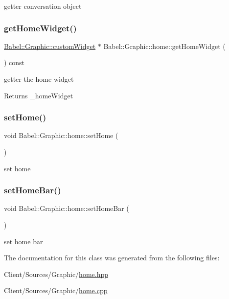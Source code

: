 getter conversation object \mbox{\label{classBabel_1_1Graphic_1_1home_a2c22835d143b5137919c9dd9fb32e653}} 
\subsubsection{\texorpdfstring{get\+Home\+Widget()}{getHomeWidget()}}
{\footnotesize\ttfamily \hyperlink{classBabel_1_1Graphic_1_1customWidget}{Babel\+::\+Graphic\+::custom\+Widget} $\ast$ Babel\+::\+Graphic\+::home\+::get\+Home\+Widget (\begin{DoxyParamCaption}{ }\end{DoxyParamCaption}) const}

getter the home widget \begin{DoxyReturn}{Returns}
\+\_\+home\+Widget 
\end{DoxyReturn}
\mbox{\label{classBabel_1_1Graphic_1_1home_ac64978cf021005f93a8050929d2151b5}} 
\subsubsection{\texorpdfstring{set\+Home()}{setHome()}}
{\footnotesize\ttfamily void Babel\+::\+Graphic\+::home\+::set\+Home (\begin{DoxyParamCaption}{ }\end{DoxyParamCaption})}

set home \mbox{\label{classBabel_1_1Graphic_1_1home_ac6ea1576dd3ad65a4ec6eccc6b943287}} 
\subsubsection{\texorpdfstring{set\+Home\+Bar()}{setHomeBar()}}
{\footnotesize\ttfamily void Babel\+::\+Graphic\+::home\+::set\+Home\+Bar (\begin{DoxyParamCaption}{ }\end{DoxyParamCaption})}

set home bar 

The documentation for this class was generated from the following files\+:\begin{DoxyCompactItemize}
\item 
Client/\+Sources/\+Graphic/\hyperlink{home_8hpp}{home.\+hpp}\item 
Client/\+Sources/\+Graphic/\hyperlink{home_8cpp}{home.\+cpp}\end{DoxyCompactItemize}
